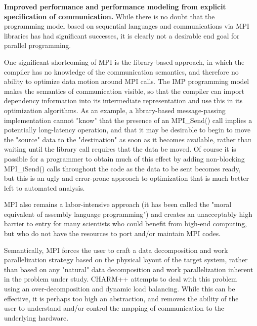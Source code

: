    \item \textbf{Improved performance and performance modeling from explicit specification of communication.}   While there is no doubt that the programming model based on sequential languages and communications via MPI libraries has had significant successes, it is clearly not a desirable end goal for parallel programming.   
   
   One significant shortcoming of MPI is the library-based approach, in which the compiler has no knowledge of the communication semantics, and therefore no ability to optimize data motion around MPI calls.  The \ac{IMP} programming model makes the semantics of communication visible, so that the compiler can import dependency information into its intermediate representation and use this in its optimization algorithms.   As an example, a library-based message-passing implementation cannot "know" that the presence of an MPI\_Send() call implies a potentially long-latency operation, and that it may be desirable to begin to move the "source" data to the "destination" as soon as it becomes available, rather than waiting until the library call requires that the data be moved.   Of course it is possible for a programmer to obtain much of this effect by adding non-blocking MPI\_iSend() calls throughout the code as the data to be sent becomes ready, but this is an ugly and error-prone approach to optimization that is much better left to automated analysis.
   
   MPI also remains a labor-intensive approach (it has been called the "moral equivalent of assembly language programming") and creates an unacceptably high barrier to entry for many scientists who could benefit from high-end computing, but who do not have the resources to port and/or maintain MPI codes.  
   
   Semantically, MPI forces the user to craft a data decomposition and work parallelization strategy based on the physical layout of the target system, rather than based on any "natural" data decomposition and work parallelization inherent in the problem under study.  CHARM++ attempts to deal with this problem using an over-decomposition and dynamic load balancing.  While this can be effective, it is perhaps too high an abstraction, and removes the ability of the user to understand and/or control the mapping of communication to the underlying hardware.  
   
